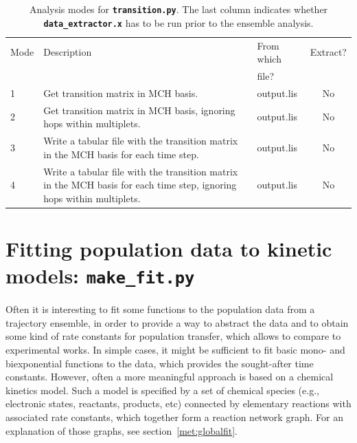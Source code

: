 \documentclass[a4paper,10pt,DIV=15,openany]{scrbook}
\newcommand{\ttt}[1]{\textbf{\texttt{#1}}}
\begin{document}
\begin{table}
  \centering
  \caption[Analysis modes for \ttt{transition.py}.]{Analysis modes for \ttt{transition.py}. The last column indicates whether \ttt{data\_extractor.x} has to be run prior to the ensemble analysis.}
  \label{tab:Transition_modes}
  \begin{tabular}{lp{8cm}>{\ttfamily}lc}
    \hline
    Mode        &Description    &\rmfamily From which     &Extract?\\
                               &&\rmfamily file?          &\\
    \hline
    1   &Get transition matrix in MCH basis. &output.lis  &No\\
    2   &Get transition matrix in MCH basis, ignoring hops within multiplets. &output.lis  &No\\
    3   &Write a tabular file with the transition matrix in the MCH basis for each time step. &output.lis  &No\\
    4   &Write a tabular file with the transition matrix in the MCH basis for each time step, ignoring hops within multiplets.   &output.lis &No\\
    \hline
  \end{tabular}
\end{table}



\section{Fitting population data to kinetic models: \ttt{make\_fit.py}}\label{sec:make_fit.py}

Often it is interesting to fit some functions to the population data from a trajectory ensemble, in order to provide a way to abstract the data and to obtain some kind of rate constants for population transfer, which allows to compare to experimental works.
In simple cases, it might be sufficient to fit basic mono- and biexponential functions to the data, which provides the sought-after time constants.
However, often a more meaningful approach is based on a chemical kinetics model.
Such a model is specified by a set of chemical species (e.g., electronic states, reactants, products, etc) connected by elementary reactions with associated rate constants, which together form a reaction network graph.
For an explanation of those graphs, see section~\ref{met:globalfit}.
\end{document}
